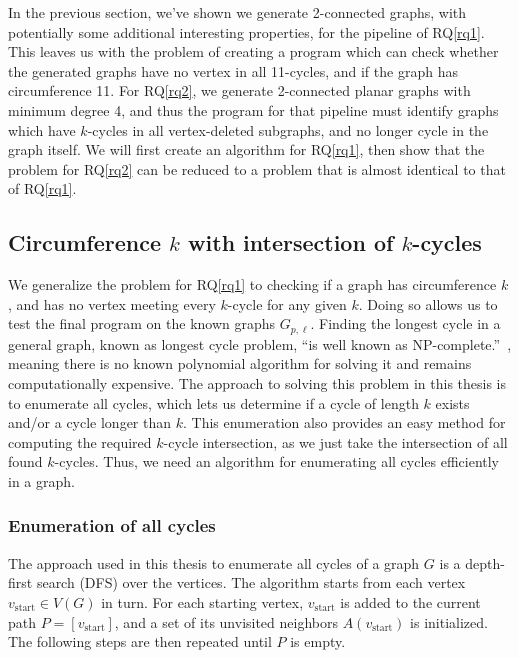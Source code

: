 In the previous section, we've shown we generate 2-connected graphs, with potentially some additional interesting properties, for the pipeline of RQ\ref{rq1}. This leaves us with the problem of creating a program which can check whether the generated graphs have no vertex in all 11-cycles, and if the graph has circumference 11. For RQ\ref{rq2}, we generate 2-connected planar graphs with minimum degree 4, and thus the program for that pipeline must identify graphs which have $k$-cycles in all vertex-deleted subgraphs, and no longer cycle in the graph itself. We will first create an algorithm for RQ\ref{rq1}, then show that the problem for RQ\ref{rq2} can be reduced to a problem that is almost identical to that of RQ\ref{rq1}.

\subsection{Circumference $k$ with intersection of $k$-cycles}

We generalize the problem for RQ\ref{rq1} to checking if a graph has circumference $k$, and has no vertex meeting every $k$-cycle for any given $k$. Doing so allows us to test the final program on the known graphs $G_{p,\ell}$. Finding the longest cycle in a general graph, known as longest cycle problem, ``is well known as NP-complete.''~\cite{article:longest-cycle-np}, meaning there is no known polynomial algorithm for solving it and remains computationally expensive. The approach to solving this problem in this thesis is to enumerate all cycles, which lets us determine if a cycle of length $k$ exists and/or a cycle longer than $k$. This enumeration also provides an easy method for computing the required $k$-cycle intersection, as we just take the intersection of all found $k$-cycles. Thus, we need an algorithm for enumerating all cycles efficiently in a graph.

\subsubsection{Enumeration of all cycles}

The approach used in this thesis to enumerate all cycles of a graph $G$ is a depth-first search (DFS) over the vertices. The algorithm starts from each vertex $v_{\text{start}} \in V(G)$ in turn. For each starting vertex, $v_{\text{start}}$ is added to the current path $P=[v_{\text{start}}]$, and a set of its unvisited neighbors $A(v_{\text{start}})$ is initialized. The following steps are then repeated until $P$ is empty.

